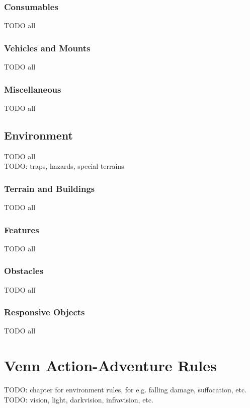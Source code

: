 \documentclass[letterpaper,titlepage,openany,twocolumn]{book}
\begin{document}
\section{Consumables}
TODO all\\

\section{Vehicles and Mounts}
TODO all\\

\section{Miscellaneous}
TODO all\\

\chapter{Environment}
TODO all\\
TODO: traps, hazards, special terrains\\

\section{Terrain and Buildings}
TODO all\\

\section{Features}
TODO all\\

\section{Obstacles}
TODO all\\

\section{Responsive Objects}
TODO all\\

\part{Venn Action-Adventure Rules}
TODO: chapter for environment rules, for e.g. falling damage, suffocation, etc.\\
TODO: vision, light, darkvision, infravision, etc.\\
\end{document}
